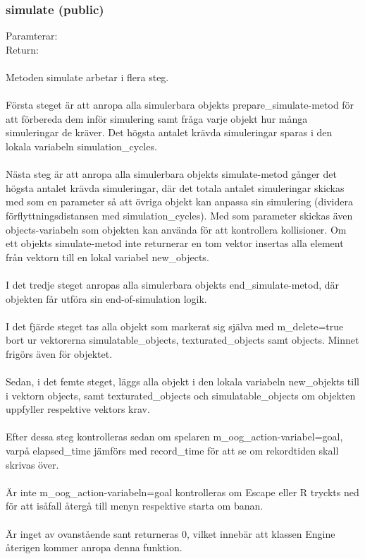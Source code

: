 \documentclass{TDP003mall}
\begin{document}
\subsubsection{simulate (public)}
Paramterar: \textit{}
\\Return: \textit{}
\\\\
Metoden simulate arbetar i flera steg.
\\\\
Första steget är att anropa alla simulerbara objekts prepare\_simulate-metod för att förbereda dem inför simulering samt fråga varje objekt hur många simuleringar de kräver. Det högsta antalet krävda simuleringar sparas i den lokala variabeln simulation\_cycles.
\\\\
Nästa steg är att anropa alla simulerbara objekts simulate-metod gånger det högsta antalet krävda simuleringar, där det totala antalet simuleringar skickas med som en parameter så att övriga objekt kan anpassa sin simulering (dividera förflyttningsdistansen med simulation\_cycles). Med som parameter skickas även objects-variabeln som objekten kan använda för att kontrollera kollisioner. Om ett objekts simulate-metod inte returnerar en tom vektor insertas alla element från vektorn till en lokal variabel new\_objects.
\\\\
I det tredje steget anropas alla simulerbara objekts end\_simulate-metod, där objekten får utföra sin end-of-simulation logik.
\\\\
I det fjärde steget tas alla objekt som markerat sig själva med m\_delete=true bort ur vektorerna simulatable\_objects, texturated\_objects samt objects. Minnet frigörs även för objektet.
\\\\
Sedan, i det femte steget, läggs alla objekt i den lokala variabeln new\_objekts till i vektorn objects, samt texturated\_objects och simulatable\_objects om objekten uppfyller respektive vektors krav.
\\\\
Efter dessa steg kontrolleras sedan om spelaren m\_oog\_action-variabel=goal, varpå elapsed\_time jämförs med record\_time för att se om rekordtiden skall skrivas över.
\\\\
Är inte m\_oog\_action-variabeln=goal kontrolleras om Escape eller R tryckts ned för att isåfall återgå till menyn respektive starta om banan.
\\\\
Är inget av ovanstående sant returneras 0, vilket innebär att klassen Engine återigen kommer anropa denna funktion.
\end{document}
